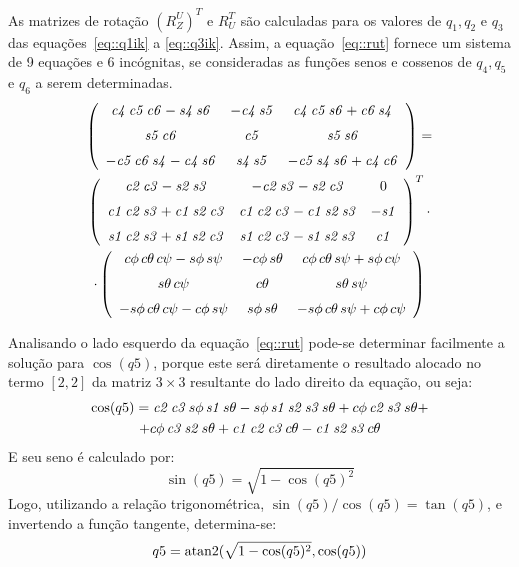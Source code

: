 As matrizes de rotação $(R_{Z}^{U})^T$ e $R_{U}^{T}$ são calculadas para os
valores de $q_1, q_2$ e $q_3$ das equações~\ref{eq::q1ik} a \ref{eq::q3ik}.
Assim, a equação~\ref{eq::rut} fornece um sistema de 9 equações e 6
incógnitas, se consideradas as funções senos e cossenos de $q_4, q_5$ e $q_6$ a serem
determinadas.
%
\begin{multline} \label{eq::rut}
	 \left( \begin {array}{ccc} {\it c4}\,{\it c5}\,{\it c6}-{\it s4}\,{
\it s6}&-{\it c4}\,{\it s5}&{\it c4}\,{\it c5}\,{\it s6}+{\it c6}\,{
\it s4}\\ \noalign{\medskip}{\it s5}\,{\it c6}&{\it c5}&{\it s5}\,{
\it s6}\\ \noalign{\medskip}-{\it c5}\,{\it c6}\,{\it s4}-{\it c4}\,{
\it s6}&{\it s4}\,{\it s5}&-{\it c5}\,{\it s4}\,{\it s6}+{\it c4}\,{
\it c6}\end {array} \right) = \\
	 \left( \begin {array}{ccc} {\it c2}\,{\it c3}-{\it s2}\,{\it s3}&-{
\it c2}\,{\it s3}-{\it s2}\,{\it c3}&0\\ \noalign{\medskip}{\it c1}\,{
\it c2}\,{\it s3}+{\it c1}\,{\it s2}\,{\it c3}&{\it c1}\,{\it c2}\,{
\it c3}-{\it c1}\,{\it s2}\,{\it s3}&-{\it s1}\\ \noalign{\medskip}{
\it s1}\,{\it c2}\,{\it s3}+{\it s1}\,{\it s2}\,{\it c3}&{\it s1}\,{
\it c2}\,{\it c3}-{\it s1}\,{\it s2}\,{\it s3}&{\it c1}\end {array}
 \right)^T \cdot \\
	\cdot \left( \begin {array}{ccc} c\phi \,c\theta \,c\psi -s\phi \,s\psi &-c
\phi \,s\theta &c\phi \,c\theta \,s\psi +s\phi \,c\psi 
\\ \noalign{\medskip}s\theta \,c\psi &c\theta &s\theta \,s\psi 
\\ \noalign{\medskip}-s\phi \,c\theta \,c\psi -c\phi \,s\psi &s\phi \,
s\theta &-s\phi \,c\theta \,s\psi +c\phi \,c\psi \end {array} \right) 
\end{multline}
%

Analisando o lado esquerdo da equação~\ref{eq::rut} pode-se determinar
facilmente a solução para $\cos(q5)$, porque este será diretamente o resultado
alocado no termo $[2,2]$ da matriz $3 \times 3$ resultante do lado direito da
equação, ou seja:
%
\begin{multline}
\cos(q5) = {\it c2}\,{\it c3}\,s\phi \,{\it s1}\,s\theta -s\phi \,{\it s1}\,{\it 
		s2}\,{\it s3}\,s\theta +c\phi \,{\it c2}\,{\it s3}\,s\theta +
		\\ +c\phi \,{\it c3}\,{\it s2}\,s\theta +{\it c1}\,{\it c2}\,{\it c3}\,c\theta -{
		\it c1}\,{\it s2}\,{\it s3}\,c\theta 
\end{multline}
%
E seu seno é calculado por:
%
\begin{equation}
	\sin(q5) = \sqrt{1-\cos(q5)^2}
\end{equation}
%
Logo, utilizando a relação trigonométrica, $\sin(q5)/\cos(q5) = \tan(q5)$,
e invertendo a função tangente, determina-se:
%
\begin{equation}
	q5 = \operatorname{atan2}(\sqrt{1-\cos(q5)^2}, \cos(q5))
\end{equation}
%

